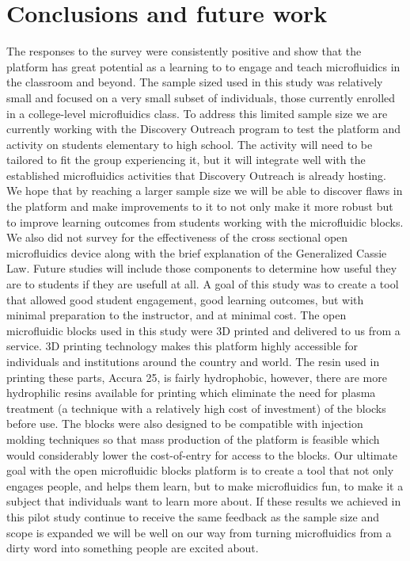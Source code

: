 \section{Conclusions and future work}
The responses to the survey were consistently positive and show that the platform has great potential as a learning to to engage and teach microfluidics in the classroom and beyond. The sample sized used in this study was relatively small and focused on a very small subset of individuals, those currently enrolled in a college-level microfluidics class. To address this limited sample size we are currently working with the Discovery Outreach program to test the platform and activity on students elementary to high school. The activity will need to be tailored to fit the group experiencing it, but it will integrate well with the established microfluidics activities that Discovery Outreach is already hosting. We hope that by reaching a larger sample size we will be able to discover flaws in the platform and make improvements to it to not only make it more robust but to improve learning outcomes from students working with the microfluidic blocks. We also did not survey for the effectiveness of the cross sectional open microfluidics device along with the brief explanation of the Generalized Cassie Law. Future studies will include those components to determine how useful they are to students if they are usefull at all.
A goal of this study was to create a tool that allowed good student engagement, good learning outcomes, but with minimal preparation to the instructor, and at minimal cost. The open microfluidic blocks used in this study were 3D printed and delivered to us from a service. 3D printing technology makes this platform highly accessible for individuals and institutions around the country and world. The resin used in printing these parts, Accura 25, is fairly hydrophobic, however, there are more hydrophilic resins available for printing which eliminate the need for plasma treatment (a technique with a relatively high cost of investment) of the blocks before use. The blocks were also designed to be compatible with injection molding techniques so that mass production of the platform is feasible which would considerably lower the cost-of-entry for access to the blocks. 
Our ultimate goal with the open microfluidic blocks platform is to create a tool that not only engages people, and helps them learn, but to make microfluidics fun, to make it a subject that individuals want to learn more about. If these results we achieved in this pilot study continue to receive the same feedback as the sample size and scope is expanded we will be well on our way from turning microfluidics from a dirty word into something people are excited about.








